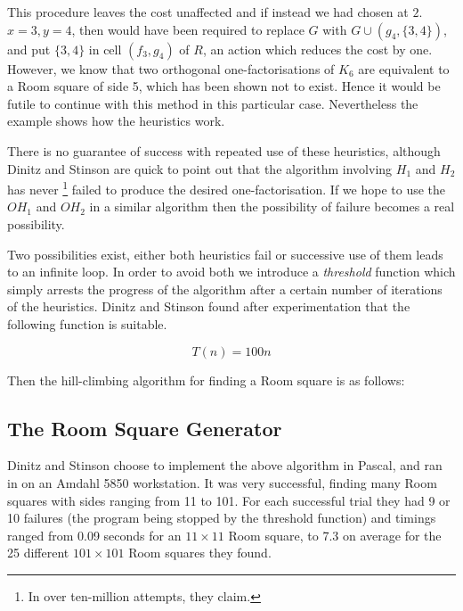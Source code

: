 \documentclass[11pt, a4paper]{book}\usepackage[]{graphicx}\usepackage[]{xcolor}
\newcounter{example}
\begin{document}
\begin{example}
This procedure leaves the cost unaffected and if instead we had
chosen at $2$. $x = 3, y = 4$, then would have been required to
replace $G$ with $G \cup (g_4,\{3,4\})$, and put $\{3, 4\}$ in
cell $(f_3, g_4)$ of $R$, an action which reduces the cost by one.
However, we know that two orthogonal one-factorisations of $K_6$
are equivalent to a Room square of side 5, which has been shown
not to exist. Hence it would be futile to continue with this
method in this particular case. Nevertheless the example shows
how the heuristics work.
\end{example}

There is no guarantee of success with repeated use of these
heuristics, although Dinitz and Stinson are quick to point out that
the algorithm involving $H_1$ and $H_2$ has never
\footnote{In over ten-million attempts, they claim.}
failed to
produce the desired one-factorisation. If we hope to use the
$OH_1$ and $OH_2$ in a similar algorithm then the possibility of
failure becomes a real possibility.

Two possibilities exist, either both heuristics fail or
successive use of them leads to an infinite loop. In order to
avoid both we introduce a
\emph{threshold}
function which simply
arrests the progress of the algorithm after a certain number of
iterations of the heuristics. Dinitz and Stinson found after
experimentation that the following function is suitable.

\begin{equation}
T(n) = 100n
\end{equation}

Then the hill-climbing algorithm for finding a Room square is as
follows:

\begin{algorithm}[H]
\end{algorithm}

\subsection{The Room Square Generator}

Dinitz and Stinson choose to implement the above algorithm in
Pascal, and ran in on an Amdahl 5850 workstation. It was very
successful, finding many Room squares with sides ranging from 11
to 101. For each successful trial they had 9 or 10 failures (the
program being stopped by the threshold function) and timings
ranged from 0.09 seconds for an
$11 \times 11$
Room square, to 7.3 on
average for the 25 different
$101 \times 101$
Room squares they found.
\end{document}
